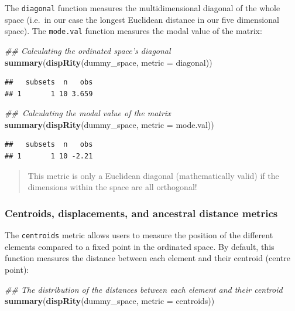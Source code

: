 \documentclass[]{book}
\newenvironment{Shaded}{\begin{snugshade}}{\end{snugshade}}
\newcommand{\CommentTok}[1]{\textcolor[rgb]{0.56,0.35,0.01}{\textit{#1}}}
\newcommand{\DataTypeTok}[1]{\textcolor[rgb]{0.13,0.29,0.53}{#1}}
\newcommand{\KeywordTok}[1]{\textcolor[rgb]{0.13,0.29,0.53}{\textbf{#1}}}
\newcommand{\NormalTok}[1]{#1}
\begin{document}
The \texttt{diagonal} function measures the multidimensional diagonal of the whole space (i.e.~in our case the longest Euclidean distance in our five dimensional space).
The \texttt{mode.val} function measures the modal value of the matrix:

\begin{Shaded}
\begin{Highlighting}[]
\CommentTok{## Calculating the ordinated space's diagonal}
\KeywordTok{summary}\NormalTok{(}\KeywordTok{dispRity}\NormalTok{(dummy_space, }\DataTypeTok{metric =}\NormalTok{ diagonal))}
\end{Highlighting}
\end{Shaded}

\begin{verbatim}
##   subsets  n   obs
## 1       1 10 3.659
\end{verbatim}

\begin{Shaded}
\begin{Highlighting}[]
\CommentTok{## Calculating the modal value of the matrix}
\KeywordTok{summary}\NormalTok{(}\KeywordTok{dispRity}\NormalTok{(dummy_space, }\DataTypeTok{metric =}\NormalTok{ mode.val))}
\end{Highlighting}
\end{Shaded}

\begin{verbatim}
##   subsets  n   obs
## 1       1 10 -2.21
\end{verbatim}

\begin{quote}
This metric is only a Euclidean diagonal (mathematically valid) if the dimensions within the space are all orthogonal!
\end{quote}

\hypertarget{centroids}{%
\subsubsection{Centroids, displacements, and ancestral distance metrics}\label{centroids}}

The \texttt{centroids} metric allows users to measure the position of the different elements compared to a fixed point in the ordinated space.
By default, this function measures the distance between each element and their centroid (centre point):

\begin{Shaded}
\begin{Highlighting}[]
\CommentTok{## The distribution of the distances between each element and their centroid}
\KeywordTok{summary}\NormalTok{(}\KeywordTok{dispRity}\NormalTok{(dummy_space, }\DataTypeTok{metric =}\NormalTok{ centroids))}
\end{Highlighting}
\end{Shaded}
\end{document}

